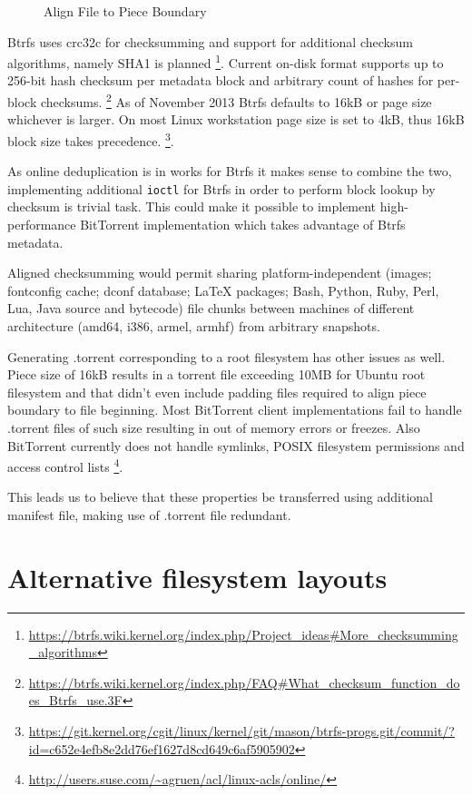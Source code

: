 \documentclass[a4paper,11pt]{kth-mag}
\begin{document}
\begin{figure}[!htb]
\centering
\scalebox{0.35}{}
\caption{Align File to Piece Boundary}
\label{fig:torrent-multifile-aligned}
\end{figure}


Btrfs uses crc32c for checksumming and support for additional
checksum algorithms, namely SHA1 is planned
\footnote{\url{https://btrfs.wiki.kernel.org/index.php/Project_ideas\#More_checksumming_algorithms}}.
Current on-disk format supports up to 256-bit hash checksum per
metadata block and arbitrary count of hashes for per-block checksums.
\footnote{\url{https://btrfs.wiki.kernel.org/index.php/FAQ\#What_checksum_function_does_Btrfs_use.3F}}
As of November 2013 Btrfs defaults to 16kB or page size
whichever is larger.
On most Linux workstation page size is set to 4kB, thus 16kB block
size takes precedence.
\footnote{\url{https://git.kernel.org/cgit/linux/kernel/git/mason/btrfs-progs.git/commit/?id=c652e4efb8e2dd76ef1627d8cd649c6af5905902}}.

As online deduplication is in works for Btrfs it makes sense to
combine the two, implementing additional \texttt{ioctl} for Btrfs in
order to perform block lookup by checksum is trivial task.
This could make it possible to implement high-performance
BitTorrent implementation which takes advantage of Btrfs metadata.

Aligned checksumming would permit sharing platform-independent
(images; fontconfig cache; dconf database; LaTeX packages;
Bash, Python, Ruby, Perl, Lua, Java source and bytecode)
file chunks between machines of different architecture (amd64, i386, armel, armhf)
from arbitrary snapshots.

Generating .torrent corresponding to a root filesystem
has other issues as well.
Piece size of 16kB results in a torrent file
exceeding 10MB for Ubuntu root filesystem and that didn't even
include padding files required to align piece boundary to file beginning.
Most BitTorrent client implementations fail to handle .torrent
files of such size resulting in out of memory errors or freezes.
Also BitTorrent currently does not handle symlinks,
POSIX filesystem permissions and access control lists
\footnote{\url{http://users.suse.com/~agruen/acl/linux-acls/online/}}.

This leads us to believe that these properties be transferred
using additional manifest file, making use of .torrent file redundant.

\section{Alternative filesystem layouts}
\end{document}
